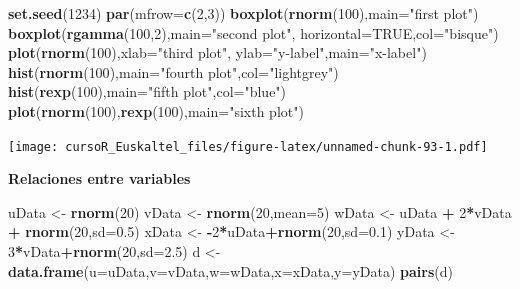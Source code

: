 \documentclass[]{book}
\newenvironment{Shaded}{\begin{snugshade}}{\end{snugshade}}
\newcommand{\KeywordTok}[1]{\textcolor[rgb]{0.13,0.29,0.53}{\textbf{#1}}}
\newcommand{\DataTypeTok}[1]{\textcolor[rgb]{0.13,0.29,0.53}{#1}}
\newcommand{\DecValTok}[1]{\textcolor[rgb]{0.00,0.00,0.81}{#1}}
\newcommand{\FloatTok}[1]{\textcolor[rgb]{0.00,0.00,0.81}{#1}}
\newcommand{\StringTok}[1]{\textcolor[rgb]{0.31,0.60,0.02}{#1}}
\newcommand{\OtherTok}[1]{\textcolor[rgb]{0.56,0.35,0.01}{#1}}
\newcommand{\OperatorTok}[1]{\textcolor[rgb]{0.81,0.36,0.00}{\textbf{#1}}}
\newcommand{\NormalTok}[1]{#1}
\begin{document}
\begin{Shaded}
\begin{Highlighting}[]
\KeywordTok{set.seed}\NormalTok{(}\DecValTok{1234}\NormalTok{)}
 \KeywordTok{par}\NormalTok{(}\DataTypeTok{mfrow=}\KeywordTok{c}\NormalTok{(}\DecValTok{2}\NormalTok{,}\DecValTok{3}\NormalTok{))}
 \KeywordTok{boxplot}\NormalTok{(}\KeywordTok{rnorm}\NormalTok{(}\DecValTok{100}\NormalTok{),}\DataTypeTok{main=}\StringTok{"first plot"}\NormalTok{)}
 \KeywordTok{boxplot}\NormalTok{(}\KeywordTok{rgamma}\NormalTok{(}\DecValTok{100}\NormalTok{,}\DecValTok{2}\NormalTok{),}\DataTypeTok{main=}\StringTok{"second plot"}\NormalTok{, }\DataTypeTok{horizontal=}\OtherTok{TRUE}\NormalTok{,}\DataTypeTok{col=}\StringTok{"bisque"}\NormalTok{)}
 \KeywordTok{plot}\NormalTok{(}\KeywordTok{rnorm}\NormalTok{(}\DecValTok{100}\NormalTok{),}\DataTypeTok{xlab=}\StringTok{"third plot"}\NormalTok{,}
      \DataTypeTok{ylab=}\StringTok{"y-label"}\NormalTok{,}\DataTypeTok{main=}\StringTok{"x-label"}\NormalTok{)}
 \KeywordTok{hist}\NormalTok{(}\KeywordTok{rnorm}\NormalTok{(}\DecValTok{100}\NormalTok{),}\DataTypeTok{main=}\StringTok{"fourth plot"}\NormalTok{,}\DataTypeTok{col=}\StringTok{"lightgrey"}\NormalTok{)}
 \KeywordTok{hist}\NormalTok{(}\KeywordTok{rexp}\NormalTok{(}\DecValTok{100}\NormalTok{),}\DataTypeTok{main=}\StringTok{"fifth plot"}\NormalTok{,}\DataTypeTok{col=}\StringTok{"blue"}\NormalTok{)}
 \KeywordTok{plot}\NormalTok{(}\KeywordTok{rnorm}\NormalTok{(}\DecValTok{100}\NormalTok{),}\KeywordTok{rexp}\NormalTok{(}\DecValTok{100}\NormalTok{),}\DataTypeTok{main=}\StringTok{"sixth plot"}\NormalTok{)}
\end{Highlighting}
\end{Shaded}

\texttt{[image: cursoR\_Euskaltel\_files/figure-latex/unnamed-chunk-93-1.pdf]}

\textbf{Relaciones entre variables}

\begin{Shaded}
\begin{Highlighting}[]
\NormalTok{uData <-}\StringTok{ }\KeywordTok{rnorm}\NormalTok{(}\DecValTok{20}\NormalTok{)}
\NormalTok{vData <-}\StringTok{ }\KeywordTok{rnorm}\NormalTok{(}\DecValTok{20}\NormalTok{,}\DataTypeTok{mean=}\DecValTok{5}\NormalTok{)}
\NormalTok{wData <-}\StringTok{ }\NormalTok{uData }\OperatorTok{+}\StringTok{ }\DecValTok{2}\OperatorTok{*}\NormalTok{vData }\OperatorTok{+}\StringTok{ }\KeywordTok{rnorm}\NormalTok{(}\DecValTok{20}\NormalTok{,}\DataTypeTok{sd=}\FloatTok{0.5}\NormalTok{)}
\NormalTok{xData <-}\StringTok{ }\OperatorTok{-}\DecValTok{2}\OperatorTok{*}\NormalTok{uData}\OperatorTok{+}\KeywordTok{rnorm}\NormalTok{(}\DecValTok{20}\NormalTok{,}\DataTypeTok{sd=}\FloatTok{0.1}\NormalTok{)}
\NormalTok{yData <-}\StringTok{  }\DecValTok{3}\OperatorTok{*}\NormalTok{vData}\OperatorTok{+}\KeywordTok{rnorm}\NormalTok{(}\DecValTok{20}\NormalTok{,}\DataTypeTok{sd=}\FloatTok{2.5}\NormalTok{)}
\NormalTok{d <-}\StringTok{ }\KeywordTok{data.frame}\NormalTok{(}\DataTypeTok{u=}\NormalTok{uData,}\DataTypeTok{v=}\NormalTok{vData,}\DataTypeTok{w=}\NormalTok{wData,}\DataTypeTok{x=}\NormalTok{xData,}\DataTypeTok{y=}\NormalTok{yData)}
\KeywordTok{pairs}\NormalTok{(d)}
\end{Highlighting}
\end{Shaded}
\end{document}
